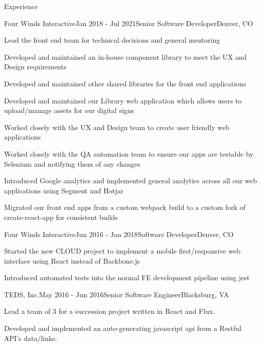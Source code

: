\documentclass{resume} %
\begin{document}
\begin{rSection}{Experience}
	\begin{rSubsection}{Four Winds Interactive}{Jan 2018 - Jul 2021}{Senior Software Developer}{Denver, CO}
		\item Lead the front end team for technical decisions and general mentoring
		\item Developed and maintained an in-house component library to meet the UX and Design requirements
		\item Developed and maintained other shared libraries for the front end applications
		\item Developed and maintained our Library web application which allows users to upload/manage assets for our digital signs
		\item Worked closely with the UX and Design team to create user friendly web applications
		\item Worked closely with the QA automation team to ensure our apps are testable by Selenium and notifying them of any changes
		\item Introduced Google analytics and implemented general analytics across all our web applications using Segment and Hotjar
		\item Migrated our front end apps from a custom webpack build to a custom fork of create-react-app for consistent builds
	\end{rSubsection}

	\begin{rSubsection}{Four Winds Interactive}{Jun 2016 - Jan 2018}{Software Developer}{Denver, CO}
		\item Started the new CLOUD project to implement a mobile first/responsive web interface using React instead of Backbone.js
		\item Introduced automated tests into the normal FE development pipeline using jest
	\end{rSubsection}


	\begin{rSubsection}{TEDS, Inc.}{May 2016 - Jun 2016}{Senior Software Engineer}{Blacksburg, VA}
		\item Lead a team of 3 for a succession project written in React and Flux.
		\item Developed and implemented an auto-generating javascript api from a Restful API's data/links.
	\end{rSubsection}


\end{rSection}
\end{document}
